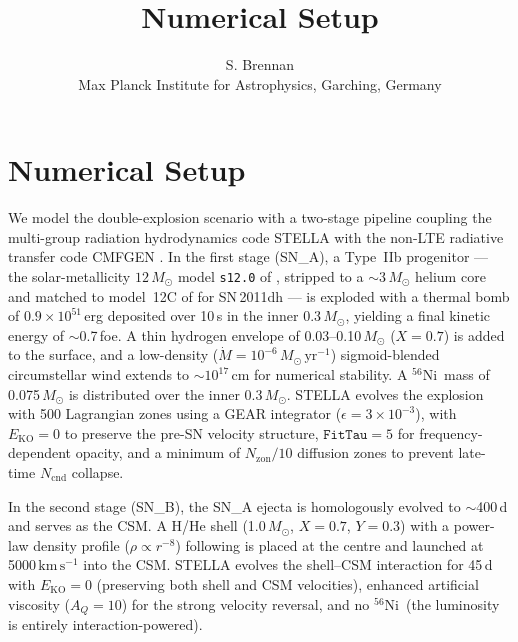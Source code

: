 \documentclass[11pt, a4paper]{article}
\newcommand{\Msun}{\ensuremath{M_\odot}}
\newcommand{\kms}{\ensuremath{\mathrm{km\,s^{-1}}}}
\newcommand{\Ni}{\ensuremath{^{56}\mathrm{Ni}}}
\newcommand{\EKO}{\ensuremath{E_{\mathrm{KO}}}}
\newcommand{\Ncnd}{\ensuremath{N_{\mathrm{cnd}}}}
\begin{document}
\title{Numerical Setup}
\author{S. Brennan\\
\small Max Planck Institute for Astrophysics, Garching, Germany}
\date{}

\maketitle

\section*{Numerical Setup}

We model the double-explosion scenario with a two-stage pipeline coupling the
multi-group radiation hydrodynamics code STELLA \citep{Blinnikov1998,
Blinnikov2006} with the non-LTE radiative transfer code CMFGEN
\citep{Hillier1998, Dessart2015}.  In the first stage (SN\_A), a Type~IIb
progenitor --- the solar-metallicity $12\,M_\odot$ model \texttt{s12.0} of
\citet{WoosleyHeger2007}, stripped to a $\sim$3\,$\Msun$ helium core and
matched to model~12C of \citet{Ergon2022} for SN\,2011dh --- is exploded with a
thermal bomb of $0.9 \times 10^{51}$\,erg deposited over 10\,s in the inner
0.3\,$\Msun$, yielding a final kinetic energy of $\sim$0.7\,foe.  A thin
hydrogen envelope of 0.03--0.10\,$\Msun$ ($X = 0.7$) is added to the surface,
and a low-density ($\dot{M} = 10^{-6}\,\Msun\,\mathrm{yr^{-1}}$) sigmoid-blended
circumstellar wind extends to $\sim$$10^{17}$\,cm for numerical stability.  A
\Ni\ mass of 0.075\,$\Msun$ \citep{Ergon2022} is distributed over the inner
0.3\,$\Msun$.  STELLA evolves the explosion with 500 Lagrangian zones using a
GEAR integrator ($\epsilon = 3 \times 10^{-3}$), with $\EKO = 0$ to preserve the
pre-SN velocity structure, $\mathtt{FitTau} = 5$ for frequency-dependent
opacity, and a minimum of $N_{\mathrm{zon}}/10$ diffusion zones to prevent
late-time $\Ncnd$ collapse.

In the second stage (SN\_B), the SN\_A ejecta is homologously evolved to
$\sim$400\,d and serves as the CSM.  A H/He shell (1.0\,$\Msun$, $X = 0.7$,
$Y = 0.3$) with a power-law density profile ($\rho \propto r^{-8}$) following
\citet{Dessart2016} is placed at the centre and launched at 5000\,$\kms$ into
the CSM.  STELLA evolves the shell--CSM interaction for 45\,d with
$\EKO = 0$ (preserving both shell and CSM velocities), enhanced artificial
viscosity ($A_Q = 10$) for the strong velocity reversal, and no \Ni\ (the
luminosity is entirely interaction-powered).
\end{document}
